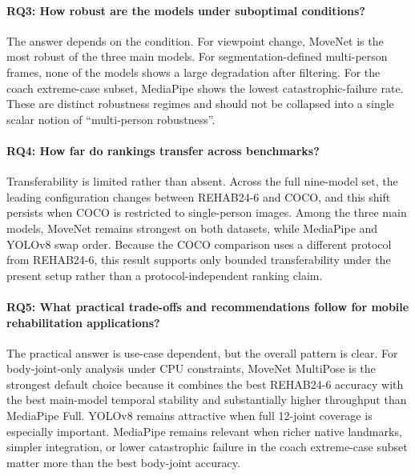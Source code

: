 \paragraph{RQ3: How robust are the models under suboptimal conditions?}

The answer depends on the condition. For viewpoint change, MoveNet is the most robust of the three main models. For segmentation-defined multi-person frames, none of the models shows a large degradation after filtering. For the coach extreme-case subset, MediaPipe shows the lowest catastrophic-failure rate. These are distinct robustness regimes and should not be collapsed into a single scalar notion of ``multi-person robustness''.

\paragraph{RQ4: How far do rankings transfer across benchmarks?}

Transferability is limited rather than absent. Across the full nine-model set, the leading configuration changes between REHAB24-6 and COCO, and this shift persists when COCO is restricted to single-person images. Among the three main models, MoveNet remains strongest on both datasets, while MediaPipe and YOLOv8 swap order. Because the COCO comparison uses a different protocol from REHAB24-6, this result supports only bounded transferability under the present setup rather than a protocol-independent ranking claim.

\paragraph{RQ5: What practical trade-offs and recommendations follow for mobile rehabilitation applications?}

The practical answer is use-case dependent, but the overall pattern is clear. For body-joint-only analysis under CPU constraints, MoveNet MultiPose is the strongest default choice because it combines the best REHAB24-6 accuracy with the best main-model temporal stability and substantially higher throughput than MediaPipe Full. YOLOv8 remains attractive when full 12-joint coverage is especially important. MediaPipe remains relevant when richer native landmarks, simpler integration, or lower catastrophic failure in the coach extreme-case subset matter more than the best body-joint accuracy.


